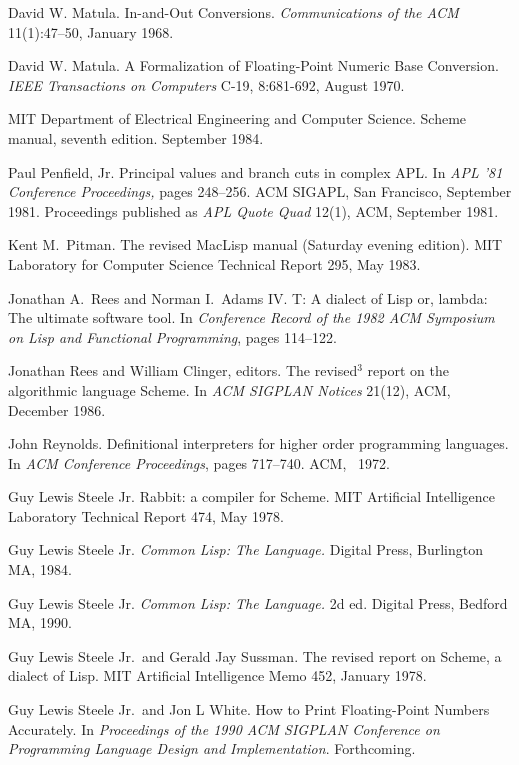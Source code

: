 \begin{thebibliography}{99}
David W. Matula.
In-and-Out Conversions.
{\em Communications of the ACM} 11(1):47--50, January 1968.

David W. Matula.
A Formalization of Floating-Point Numeric Base Conversion.
{\em IEEE Transactions on Computers} C-19, 8:681-692, August 1970.

MIT Department of Electrical Engineering and Computer Science.
Scheme manual, seventh edition.
September 1984.

Paul Penfield, Jr.
Principal values and branch cuts in complex APL.
In {\em APL '81 Conference Proceedings,} pages 248--256.
ACM SIGAPL, San Francisco, September 1981.
Proceedings published as {\em APL Quote Quad} 12(1), ACM, September 1981.

Kent M.~Pitman.
The revised MacLisp manual (Saturday evening edition).
MIT Laboratory for Computer Science Technical Report 295, May 1983.

Jonathan A.~Rees and Norman I.~Adams IV.
T: A dialect of Lisp or, lambda: The ultimate software tool.
In {\em Conference Record of the 1982 ACM Symposium on Lisp and
  Functional Programming}, pages 114--122.

Jonathan Rees and William Clinger, editors.
The revised$^3$ report on the algorithmic language Scheme.
In {\em ACM SIGPLAN Notices} 21(12), ACM, December 1986.

John Reynolds.
Definitional interpreters for higher order programming languages.
In {\em ACM Conference Proceedings}, pages 717--740.
ACM, ~1972.

Guy Lewis Steele Jr.
Rabbit: a compiler for Scheme.
MIT Artificial Intelligence Laboratory Technical Report 474, May 1978.

Guy Lewis Steele Jr.
{\em Common Lisp: The Language.}
Digital Press, Burlington MA, 1984.

Guy Lewis Steele Jr.
{\em Common Lisp: The Language.} 2d ed.
Digital Press, Bedford MA, 1990.

Guy Lewis Steele Jr.~and Gerald Jay Sussman.
The revised report on Scheme, a dialect of Lisp.
MIT Artificial Intelligence Memo 452, January 1978.

Guy Lewis Steele Jr.~and Jon L White.
How to Print Floating-Point Numbers Accurately.
In {\em Proceedings of the 1990 ACM SIGPLAN Conference on Programming
  Language Design and Implementation}.  Forthcoming.


\end{thebibliography}
